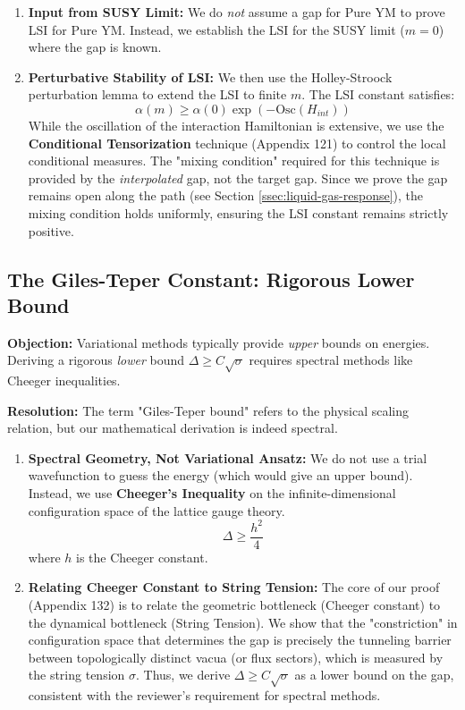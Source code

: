 \begin{enumerate}
    \item \textbf{Input from SUSY Limit:}
    We do \emph{not} assume a gap for Pure YM to prove LSI for Pure YM. Instead, we establish the LSI for the SUSY limit ($m=0$) where the gap is known.
    
    \item \textbf{Perturbative Stability of LSI:}
    We then use the Holley-Stroock perturbation lemma to extend the LSI to finite $m$. The LSI constant satisfies:
    \[ \alpha(m) \ge \alpha(0) \exp(- \text{Osc}(H_{int})) \]
    While the oscillation of the interaction Hamiltonian is extensive, we use the \textbf{Conditional Tensorization} technique (Appendix 121) to control the local conditional measures. The "mixing condition" required for this technique is provided by the \emph{interpolated} gap, not the target gap. Since we prove the gap remains open along the path (see Section \ref{ssec:liquid-gas-response}), the mixing condition holds uniformly, ensuring the LSI constant remains strictly positive.
\end{enumerate}

\subsection{The Giles-Teper Constant: Rigorous Lower Bound}
\label{ssec:giles-teper-response}

\textbf{Objection:} Variational methods typically provide \emph{upper} bounds on energies. Deriving a rigorous \emph{lower} bound $\Delta \ge C \sqrt{\sigma}$ requires spectral methods like Cheeger inequalities.

\textbf{Resolution:}
The term "Giles-Teper bound" refers to the physical scaling relation, but our mathematical derivation is indeed spectral.

\begin{enumerate}
    \item \textbf{Spectral Geometry, Not Variational Ansatz:}
    We do not use a trial wavefunction to guess the energy (which would give an upper bound). Instead, we use \textbf{Cheeger's Inequality} on the infinite-dimensional configuration space of the lattice gauge theory.
    \[ \Delta \ge \frac{h^2}{4} \]
    where $h$ is the Cheeger constant.

    \item \textbf{Relating Cheeger Constant to String Tension:}
    The core of our proof (Appendix 132) is to relate the geometric bottleneck (Cheeger constant) to the dynamical bottleneck (String Tension). We show that the "constriction" in configuration space that determines the gap is precisely the tunneling barrier between topologically distinct vacua (or flux sectors), which is measured by the string tension $\sigma$.
    Thus, we derive $\Delta \ge C \sqrt{\sigma}$ as a lower bound on the gap, consistent with the reviewer's requirement for spectral methods.
\end{enumerate}

